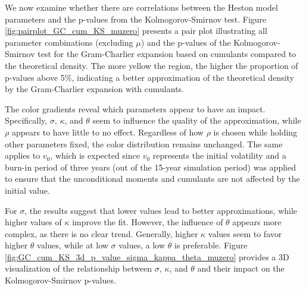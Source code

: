 We now examine whether there are correlations between the Heston model parameters and the p-values from the Kolmogorov-Smirnov test. Figure \ref{fig:pairplot_GC_cum_KS_muzero} presents a pair plot illustrating all parameter combinations (excluding $\mu$) and the p-values of the Kolmogorov-Smirnov test for the Gram-Charlier expansion based on cumulants compared to the theoretical density. The more yellow the region, the higher the proportion of p-values above 5\%, indicating a better approximation of the theoretical density by the Gram-Charlier expansion with cumulants.

The color gradients reveal which parameters appear to have an impact. Specifically, $\sigma$, $\kappa$, and $\theta$ seem to influence the quality of the approximation, while $\rho$ appears to have little to no effect. Regardless of how $\rho$ is chosen while holding other parameters fixed, the color distribution remains unchanged. The same applies to $v_0$, which is expected since $v_0$ represents the initial volatility and a burn-in period of three years (out of the 15-year simulation period) was applied to ensure that the unconditional moments and cumulants are not affected by the initial value.

For $\sigma$, the results suggest that lower values lead to better approximations, while higher values of $\kappa$ improve the fit. However, the influence of $\theta$ appears more complex, as there is no clear trend. Generally, higher $\kappa$ values seem to favor higher $\theta$ values, while at low $\sigma$ values, a low $\theta$ is preferable. Figure \ref{fig:GC_cum_KS_3d_p_value_sigma_kappa_theta_muzero} provides a 3D visualization of the relationship between $\sigma$, $\kappa$, and $\theta$ and their impact on the Kolmogorov-Smirnov p-values.

